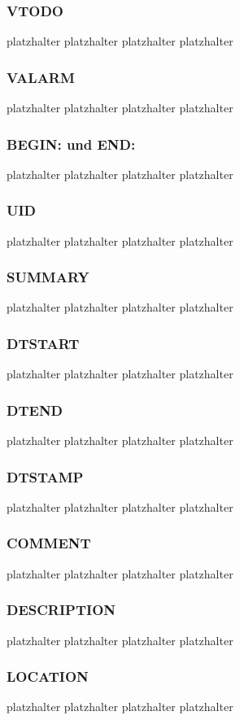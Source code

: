 \subsubsection{VTODO}
\label{sec:vTodo} 
platzhalter platzhalter platzhalter platzhalter 
\subsubsection{VALARM}
\label{sec:vAlarm} 
platzhalter platzhalter platzhalter platzhalter 
\subsubsection{BEGIN: und END:}
\label{sec:beginUndEnd} 
platzhalter platzhalter platzhalter platzhalter 
\subsubsection{UID}
\label{sec:uid}
platzhalter platzhalter platzhalter platzhalter 
\subsubsection{SUMMARY}
\label{sec:summary}
platzhalter platzhalter platzhalter platzhalter 
\subsubsection{DTSTART}
\label{sec:dtstart}
platzhalter platzhalter platzhalter platzhalter 
\subsubsection{DTEND}
\label{sec:dtend}
platzhalter platzhalter platzhalter platzhalter 
\subsubsection{DTSTAMP}
\label{sec:dtstamp}
platzhalter platzhalter platzhalter platzhalter 
\subsubsection{COMMENT}
\label{sec:comment}
platzhalter platzhalter platzhalter platzhalter 
\subsubsection{DESCRIPTION}
\label{sec:description}
platzhalter platzhalter platzhalter platzhalter 
\subsubsection{LOCATION}
\label{sec:location}
platzhalter platzhalter platzhalter platzhalter 
